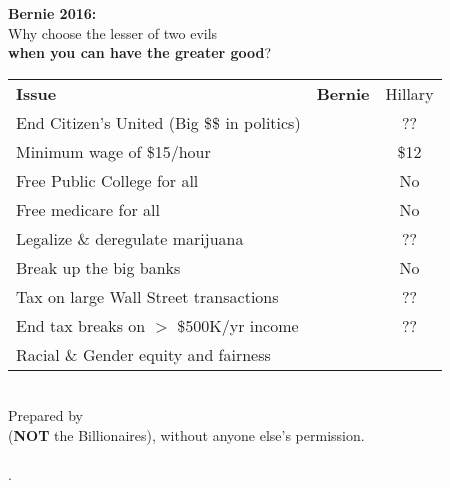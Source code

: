 \newcommand{\checkbox}{\makebox[0pt][l]{$\square$}\raisebox{.15ex}{\hspace{0.1em}$\checkmark$}}

\vspace{-12pt}

\begin{center}
  {\Huge\bf Bernie 2016:}\\

  {\small Why choose the lesser of two evils  \\
    {\bf when you can have the greater good}?}\\

  \begin{tabular}{l|c|c}
    {\bf Issue} & {\bf Bernie} & Hillary \\[2pt]
End Citizen's United (Big \$\$ in politics)  & \checkbox &	??	\\
Minimum wage of \$15/hour                    & \checkbox &	\$12	\\
Free Public College for all                  & \checkbox &	No	\\
Free medicare for all                        & \checkbox &	No	\\
Legalize \& deregulate marijuana             & \checkbox &	??	\\
Break up the big banks                       & \checkbox &	No	\\
Tax on large Wall Street transactions        & \checkbox &	??	\\
End tax breaks on $>$ \$500K/yr income       & \checkbox &	??	\\
Racial \& Gender equity and fairness         & \checkbox & \checkbox    \\
\hline
  \end{tabular}
\\
Prepared by \GroupName\\
({\bf NOT} the Billionaires), without anyone else's permission.\\
{\tt \GroupURL}\\[-45pt]
.
\end{center}	
